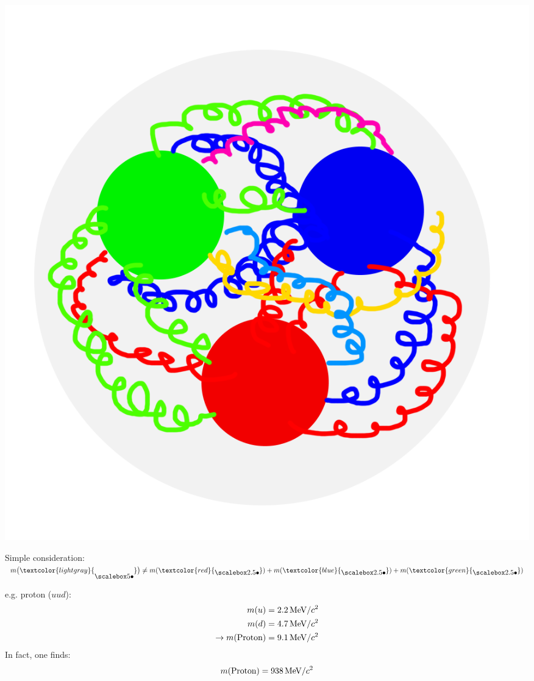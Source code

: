 \begin{frame}\addtocounter{framenumber}{-1}
\begin{minipage} {0.3\textwidth}
\includegraphics[width=\textwidth]{Figures Introductory Lecture/Standard Model/Hadron_seequarks_coloured.png}
\end{minipage}
\begin{minipage} {0.65\textwidth}
Simple consideration:\\  $m\big( \textcolor{lightgray}{ \BigbulletG}\big)\neq m(\textcolor{red}{\Bigbullet})+m(\textcolor{blue}{\Bigbullet})+m(\textcolor{green}{\Bigbullet})$
\end{minipage}
e.g. proton ($uud$):\\
\begin{align*} 
m(u)&=2.2  \,\textmd{MeV}/c^2\\m(d)&= 4.7 \, \textmd{MeV}/c^2 \\ \rightarrow m(\textmd{Proton})&=9.1  \,\textmd{MeV}/c^2
\end{align*} 
In fact, one finds:
\begin{align*} 
m(\textmd{Proton})=938  \,\textmd{MeV}/c^2
\end{align*} 
\end{frame}
